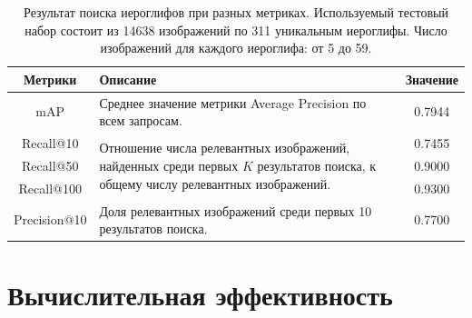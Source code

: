 \begin{table}[!htbp]
    \centering
    \captionsetup{justification=centering} %
    \caption{Результат поиска иероглифов при разных метриках. Используемый тестовый набор состоит из 14638 изображений по 311 уникальным иероглифы. Число изображений для каждого иероглифа: от 5 до 59. }\label{tab:result_2}
    \begin{tabularx}{\linewidth}{c X c}
        \toprule
        \textbf{Метрики} & \textbf{Описание} & \textbf{Значение} \\
        \midrule

        mAP              &
        Среднее значение метрики Average Precision по всем запросам.
                         & 0.7944                                \\

        \midrule

        Recall@10        &
        \multirow{3}{=}{Отношение числа релевантных изображений, найденных среди первых $K$ результатов поиска, к общему числу релевантных изображений.}
                         & 0.7455                                \\

        Recall@50        &
                         & 0.9000                                \\

        Recall@100       &
                         & 0.9300                                \\

        \midrule

        Precision@10     &
        Доля релевантных изображений среди первых 10 результатов поиска.
                         & 0.7700                                \\

        \bottomrule
    \end{tabularx}
\end{table}

\section{Вычислительная эффективность}\label{sec:ch5/sect3}


